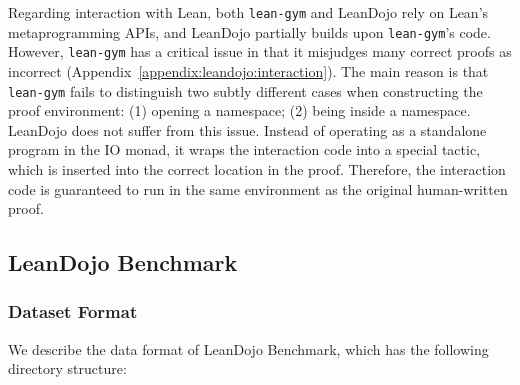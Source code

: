 Regarding interaction with Lean, both \texttt{lean-gym} and LeanDojo rely on Lean's metaprogramming APIs, and LeanDojo partially builds upon \texttt{lean-gym}'s code. However, \texttt{lean-gym} has a critical issue in that it misjudges many correct proofs as incorrect (Appendix~\ref{appendix:leandojo:interaction}). The main reason is that \texttt{lean-gym} fails to distinguish two subtly different cases when constructing the proof environment: (1) opening a namespace; (2) being inside a namespace. LeanDojo does not suffer from this issue. Instead of operating as a standalone program in the IO monad, it wraps the interaction code into a special tactic, which is inserted into the correct location in the proof. Therefore, the interaction code is guaranteed to run in the same environment as the original human-written proof.



\subsection{LeanDojo Benchmark}
\label{appendix:benchmark}


\subsubsection{Dataset Format}
\label{appendix:dataformat}

We describe the data format of LeanDojo Benchmark, which has the following directory structure:


